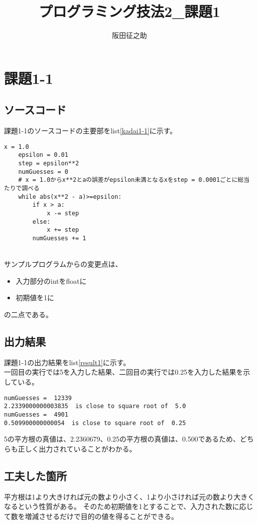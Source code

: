 \documentclass[a4paper]{ltjsarticle}
\begin{document}
\title{プログラミング技法2\_課題1}
\author{阪田征之助}
\maketitle
\newpage
\section*{課題1-1}
\subsection*{ソースコード}
課題1-1のソースコードの主要部をlist\ref{kadai1-1}に示す。

\begin{lstlisting}[caption=kadai1-1.py,label=kadai1-1]
    x = 1.0
    epsilon = 0.01
    step = epsilon**2
    numGuesses = 0
    # x = 1.0からx**2とaの誤差がepsilon未満となるxをstep = 0.0001ごとに総当たりで調べる
    while abs(x**2 - a)>=epsilon:
        if x > a:
            x -= step
        else:
            x += step
        numGuesses += 1
\end{lstlisting}

\\サンプルプログラムからの変更点は、

\begin{itemize}
    \item 入力部分のintをfloatに
    \item 初期値を1に
\end{itemize}
の二点である。

\subsection*{出力結果}
課題1-1の出力結果をlist\ref{result1}に示す。
\\一回目の実行では5を入力した結果、二回目の実行では0.25を入力した結果を示している。
\begin{lstlisting}[caption=output, label=result1]
numGuesses =  12339
2.2339000000003835  is close to square root of  5.0
numGuesses =  4901
0.509900000000054  is close to square root of  0.25
\end{lstlisting}
5の平方根の真値は、2.2360679、0.25の平方根の真値は、0.500であるため、どちらも正しく出力されていることがわかる。

\subsection*{工夫した箇所}
平方根は1より大きければ元の数より小さく、1より小さければ元の数より大きくなるという性質がある。
そのため初期値を1とすることで、入力された数に応じて数を増減させるだけで目的の値を得ることができる。
\newpage
\end{document}
